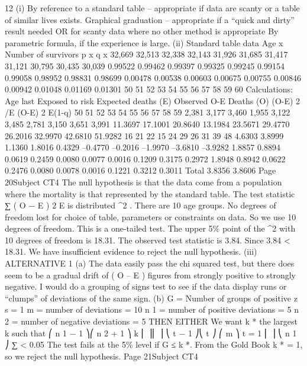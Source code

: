 12
(i)
By reference to a standard table – appropriate if data are scanty or a table of
similar lives exists.
Graphical graduation – appropriate if a “quick and dirty” result needed OR
for scanty data where no other method is appropriate
By parametric formula, if the experience is large.
(ii)
Standard table data
Age x
Number of survivors p x q x
32,669
32,513
32,338
32,143
31,926
31,685
31,417
31,121
30,795
30,435
30,039 0.99522
0.99462
0.99397
0.99325
0.99245
0.99154
0.99058
0.98952
0.98831
0.98699 0.00478
0.00538
0.00603
0.00675
0.00755
0.00846
0.00942
0.01048
0.01169
0.01301
50
51
52
53
54
55
56
57
58
59
60
Calculations:
Age last Exposed
to risk Expected
deaths (E) Observed
O-E
Deaths (O) (O-E) 2 /E (O-E) 2
E(1-q)
50
51
52
53
54
55
56
57
58
59 2,381
3,177
3,460
1,955
3,122
3,485
2,781
3,150
3,651
3,991 11.3697
17.1001
20.8640
13.1984
23.5671
29.4770
26.2016
32.9970
42.6810
51.9282 16
21
22
15
24
29
26
31
39
48 4.6303
3.8999
1.1360
1.8016
0.4329
–0.4770
–0.2016
–1.9970
–3.6810
–3.9282 1.8857
0.8894
0.0619
0.2459
0.0080
0.0077
0.0016
0.1209
0.3175
0.2972 1.8948
0.8942
0.0622
0.2476
0.0080
0.0078
0.0016
0.1221
0.3212
0.3011
Total 3.8356 3.8606
Page 20Subject CT4 %
The null hypothesis is that the data come from a population where the
mortality is that represented by the standard table.
The test statistic
∑
( O − E ) 2
E
is distributed \chi^2 .
There are 10 age groups.
No degrees of freedom lost for choice of table, parameters or constraints on
data.
So we use 10 degrees of freedom.
This is a one-tailed test.
The upper 5\% point of the \chi^2 with 10 degrees of freedom is 18.31.
The observed test statistic is 3.84.
Since 3.84 < 18.31.
We have insufficient evidence to reject the null hypothesis.
(iii)
ALTERNATIVE 1
(a) The data easily pass the chi squared test, but there does seem to be a
gradual drift of ( O – E ) figures from strongly positive to strongly
negative. I would do a grouping of signs test to see if the data
display runs or “clumps” of deviations of the same sign.
(b) G = Number of groups of positive z s = 1
m = number of deviations = 10
n 1 = number of positive deviations = 5
n 2 = number of negative deviations = 5
THEN EITHER
We want k * the largest k such that
⎛ n 1 − 1 ⎞⎛ n 2 + 1 ⎞
k ⎜
⎟⎜
⎟
⎝ t − 1 ⎠⎝ t ⎠
⎛ m ⎞
t = 1
⎜ ⎟
⎝ n 1 ⎠
∑
< 0.05
The test fails at the 5\% level if G ≤ k *.
From the Gold Book k * = 1, so we reject the null hypothesis.
Page 21Subject CT4 %
